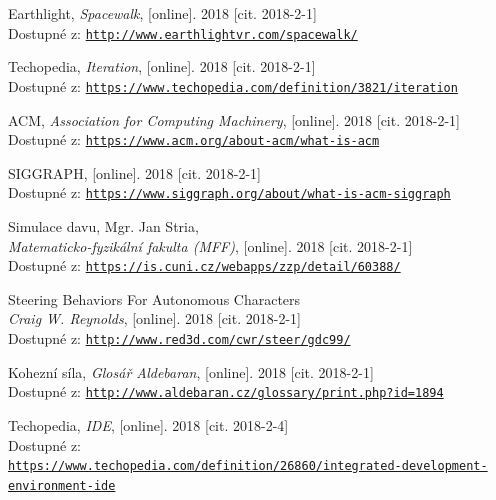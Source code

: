\documentclass[czech,public,dept460,male,cpdeclaration]{diploma}
\begin{document}
\begin{thebibliography}{99}
	
		
	 Earthlight,
		\textit{Spacewalk}, [online]. 2018 [cit. 2018-2-1]\\
		Dostupné z: \href{http://www.earthlightvr.com/spacewalk/}{\texttt{http://www.earthlightvr.com/spacewalk/}}
		
	 Techopedia,
		\textit{Iteration}, [online]. 2018 [cit. 2018-2-1]\\
		Dostupné z: \href{https://www.techopedia.com/definition/3821/iteration}{\texttt{https://www.techopedia.com/definition/3821/iteration}}
		
	 ACM,
		\textit{Association for Computing Machinery}, [online]. 2018 [cit. 2018-2-1]\\
		Dostupné z: \href{https://www.acm.org/about-acm/what-is-acm}{\texttt{https://www.acm.org/about-acm/what-is-acm}}
		
	 SIGGRAPH, [online]. 2018 [cit. 2018-2-1]\\
		Dostupné z: \href{https://www.siggraph.org/about/what-is-acm-siggraph}{\texttt{https://www.siggraph.org/about/what-is-acm-siggraph}}
		
	 Simulace davu, Mgr. Jan Stria,\\
		\textit{Matematicko-fyzikální fakulta (MFF)}, [online]. 2018 [cit. 2018-2-1]\\
		Dostupné z: \href{https://is.cuni.cz/webapps/zzp/detail/60388/}{\texttt{https://is.cuni.cz/webapps/zzp/detail/60388/}}
		
	 Steering Behaviors For Autonomous Characters\\
		\textit{Craig W. Reynolds}, [online]. 2018 [cit. 2018-2-1]\\
		Dostupné z: \href{http://www.red3d.com/cwr/steer/gdc99/}{\texttt{http://www.red3d.com/cwr/steer/gdc99/}}
		
	 Kohezní síla,
		\textit{Glosář Aldebaran}, [online]. 2018 [cit. 2018-2-1]\\
		Dostupné z: \href{http://www.aldebaran.cz/glossary/print.php?id=1894}{\texttt{http://www.aldebaran.cz/glossary/print.php?id=1894}}
		
	 Techopedia,
		\textit{IDE}, [online]. 2018 [cit. 2018-2-4]\\
		Dostupné z:\\ \href{https://www.techopedia.com/definition/26860/integrated-development-environment-ide}{\texttt{https://www.techopedia.com/definition/26860/integrated-development-environment-ide}}
		

\end{thebibliography}
\end{document}
